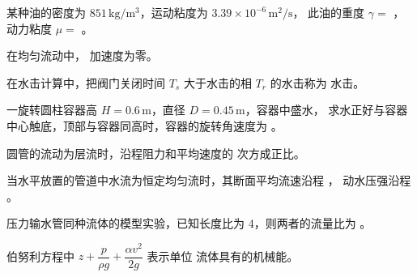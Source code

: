 \begin{ti}
  \item 某种油的密度为 $851\,\mathrm{kg/m^3}$，运动粘度为 $3.39\times10^{-6}\,\mathrm{m^2/s}$，
  此油的重度 $\gamma=$ \underline{\hspace{3cm}}，动力粘度 $\mu=$ \underline{\hspace{3cm}}。\hfill{}

  \item 在均匀流动中，\underline{\hspace{3cm}} 加速度为零。\hfill{}

  \item 在水击计算中，把阀门关闭时间 $T_s$ 大于水击的相 $T_r$ 的水击称为 \underline{\hspace{3cm}} 水击。\hfill{}

  \item 一旋转圆柱容器高 $H=0.6\,\mathrm{m}$，直径 $D=0.45\,\mathrm{m}$，容器中盛水，
  求水正好与容器中心触底，顶部与容器同高时，容器的旋转角速度为 \underline{\hspace{2.6cm}}。\hfill{}

  \item 圆管的流动为层流时，沿程阻力和平均速度的 \underline{\hspace{1.2cm}} 次方成正比。\hfill{}

  \item 当水平放置的管道中水流为恒定均匀流时，其断面平均流速沿程 \underline{\hspace{1.8cm}}，
  动水压强沿程 \underline{\hspace{1.8cm}}。\hfill{}

  \item 压力输水管同种流体的模型实验，已知长度比为 4，则两者的流量比为 \underline{\hspace{2.2cm}}。\hfill{}

  \item 伯努利方程中 $z+\dfrac{p}{\rho g}+\dfrac{\alpha v^2}{2g}$ 表示单位 \underline{\hspace{1.6cm}} 流体具有的机械能。\hfill{}
\end{ti}

